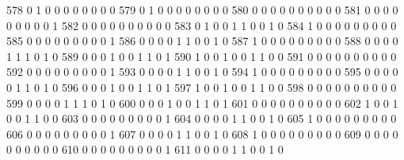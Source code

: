 \documentclass[compress,8pt]{beamer}
\begin{document}
\begin{frame}
\begin{Schunk}
  578      0       1   0              0        0    0       0       0   0   0
  579      0       1   0              0        0    0       0       0   0   0
  580      0       0   0              0        0    0       0       0   0   0
  581      0       0   0              0        0    0       0       0   0   1
  582      0       0   0              0        0    0       0       0   0   0
  583      0       1   0              0        1    1       0       0   1   0
  584      1       0   0              0        0    0       0       0   0   0
  585      0       0   0              0        0    0       0       0   0   1
  586      0       0   0              0        1    1       0       0   1   0
  587      1       0   0              0        0    0       0       0   0   0
  588      0       0   0              0        1    1       1       0   1   0
  589      0       0   0              1        0    0       1       1   0   1
  590      1       0   0              1        0    0       1       1   0   0
  591      0       0   0              0        0    0       0       0   0   0
  592      0       0   0              0        0    0       0       0   0   1
  593      0       0   0              0        1    1       0       0   1   0
  594      1       0   0              0        0    0       0       0   0   0
  595      0       0   0              0        0    1       1       0   1   0
  596      0       0   0              1        0    0       1       1   0   1
  597      1       0   0              1        0    0       1       1   0   0
  598      0       0   0              0        0    0       0       0   0   0
  599      0       0   0              0        1    1       1       0   1   0
  600      0       0   0              1        0    0       1       1   0   1
  601      0       0   0              0        0    0       0       0   0   0
  602      1       0   0              1        0    0       1       1   0   0
  603      0       0   0              0        0    0       0       0   0   1
  604      0       0   0              0        1    1       0       0   1   0
  605      1       0   0              0        0    0       0       0   0   0
  606      0       0   0              0        0    0       0       0   0   1
  607      0       0   0              0        1    1       0       0   1   0
  608      1       0   0              0        0    0       0       0   0   0
  609      0       0   0              0        0    0       0       0   0   0
  610      0       0   0              0        0    0       0       0   0   1
  611      0       0   0              0        1    1       0       0   1   0

\end{Schunk}
\end{frame}
\end{document}
